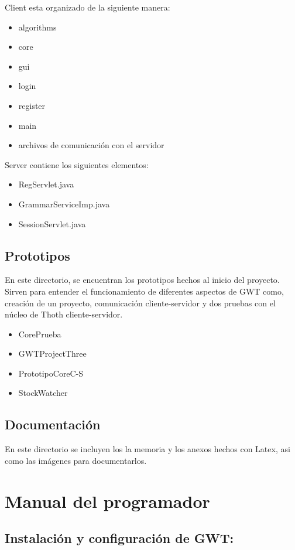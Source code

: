 Client esta organizado de la siguiente manera:

\begin{itemize}
	\item algorithms
	\item core
	\item gui
	\item login
	\item register
	\item main
	\item archivos de comunicación con el servidor
\end{itemize}	

Server contiene los siguientes elementos:
\begin{itemize}
	\item RegServlet.java
	\item GrammarServiceImp.java
	\item SessionServlet.java
\end{itemize}
\subsection{Prototipos}

En este directorio, se encuentran los prototipos hechos al inicio del proyecto. Sirven para entender el funcionamiento de diferentes aspectos de GWT como, creación de un proyecto, comunicación cliente-servidor y dos pruebas con el núcleo de Thoth cliente-servidor.

\begin{itemize}
	\item CorePrueba
	\item GWTProjectThree
	\item PrototipoCoreC-S
	\item StockWatcher
\end{itemize}	

\subsection{Documentación}

En este directorio se incluyen los la memoria y los anexos hechos con Latex, asi como las imágenes para documentarlos.

\section{Manual del programador}

\subsection{Instalación y configuración de GWT:}



